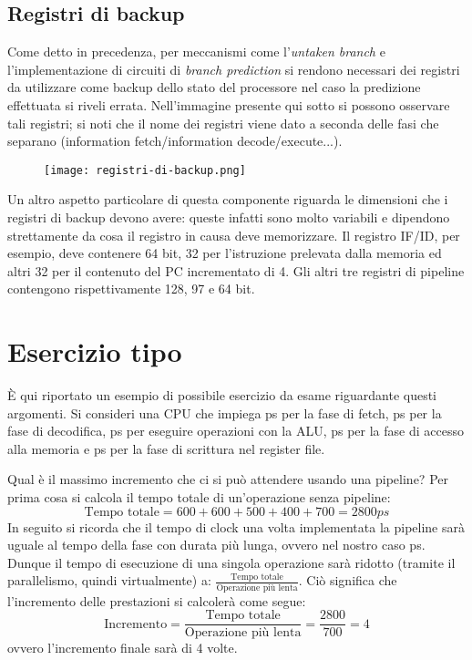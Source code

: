 \subsection{Registri di backup}
Come detto in precedenza, per meccanismi come l'\emph{untaken branch} e l'implementazione di circuiti di \emph{branch prediction} si rendono necessari dei registri da utilizzare come backup dello stato del processore nel caso la predizione effettuata si riveli errata. Nell'immagine presente qui sotto si possono osservare tali registri; si noti che il nome dei registri viene dato a seconda delle fasi che separano (information fetch/information decode/execute...).
\begin{figure}[H]
	\centering
	\texttt{[image: registri-di-backup.png]}
\end{figure}
Un altro aspetto particolare di questa componente riguarda le dimensioni che i registri di backup devono avere: queste infatti sono molto variabili e dipendono strettamente da cosa il registro in causa deve memorizzare. Il registro IF/ID, per esempio, deve contenere 64 bit, 32 per l’istruzione prelevata dalla memoria ed altri 32 per il contenuto del PC incrementato di 4. Gli altri tre registri di pipeline contengono rispettivamente 128, 97 e 64 bit.

\section{Esercizio tipo}
È qui riportato un esempio di possibile esercizio da esame riguardante questi argomenti.
Si consideri una CPU che impiega \unit[600]{ps} per la fase di fetch, \unit[600]{ps} per la fase di decodifica, \unit[500]{ps} per eseguire operazioni con la ALU, \unit[400]{ps} per la fase di accesso alla memoria e \unit[700]{ps} per la fase di scrittura nel register file.

Qual è il massimo incremento che ci si può attendere usando una pipeline?
Per prima cosa si calcola il tempo totale di un'operazione senza pipeline:
\begin{equation*}
	\text{Tempo totale} = 600+600+500+400+700 = 2800ps
\end{equation*}
In seguito si ricorda che il tempo di clock una volta implementata la pipeline sarà uguale al tempo della fase con durata più lunga, ovvero nel nostro caso \unit[700]{ps}. Dunque il tempo di esecuzione di una singola operazione sarà ridotto (tramite il parallelismo, quindi virtualmente) a: \(\frac{\text{Tempo totale}}{\text{Operazione più lenta}}\). Ciò significa che l'incremento delle prestazioni si calcolerà come segue:
\begin{equation*}
	\text{Incremento} = \frac{\text{Tempo totale}}{\text{Operazione più lenta}} = \frac{2800}{700} = 4
\end{equation*}
ovvero l'incremento finale sarà di 4 volte.


